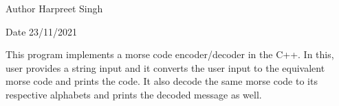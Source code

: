 \begin{DoxyAuthor}{Author}
Harpreet Singh 
\end{DoxyAuthor}
\begin{DoxyDate}{Date}
23/11/2021
\end{DoxyDate}
This program implements a morse code encoder/decoder in the C++. In this, user provides a string input and it converts the user input to the equivalent morse code and prints the code. It also decode the same morse code to its respective alphabets and prints the decoded message as well. 